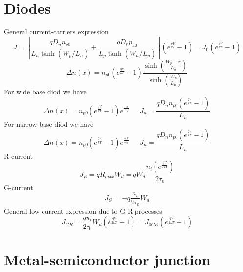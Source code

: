 \section{Diodes}

General current-carriers expression\\
\begin{equation}
J=[\frac{qD_nn_{p0}}{L_n\tanh(W_p/L_n)}+\frac{qD_pp_{n0}}{L_p\tanh(W_n/L_p)}](e^{\frac{qV}{kT}}-1)=J_0(e^{\frac{qV}{kT}}-1)
\end{equation}
\begin{equation}
\Delta n(x)=n_{p0}(e^{\frac{qV}{kT}}-1)\frac{\sinh(\frac{W_p-x}{L_n})}{\sinh(\frac{W_p}{L_n})}
\end{equation}
\vspace{3mm}
For wide base diod we have 
\begin{equation}
\Delta n(x)=n_{p0}(e^{\frac{qV}{kT}}-1)e^{\frac{-x}{L_n}} \ \ \ \ \ \ \ J_n=\frac{qD_nn_{p0}(e^{\frac{qV}{kT}}-1)}{L_n}
\end{equation}
\vspace{3mm}
For narrow base diod we have
\begin{equation}
\Delta n(x)=n_{p0}(e^{\frac{qV}{kT}}-1)e^{\frac{-x}{L_n}} \ \ \ \ \ \ \ J_n=\frac{qD_nn_{p0}(e^{\frac{qV}{kT}}-1)}{L_n}
\end{equation}
\vspace{3mm}
R-current 
\begin{equation}
J_R=qR_{max}W_d=qW_d\frac{n_i(e^{\frac{qV}{2kT}})}{2\tau_0}
\end{equation}
G-current 
\begin{equation}
J_G=-q\frac{n_i}{2\tau_0}W_d
\end{equation}
General low current expression due to G-R processes
\begin{equation}
J_{GR}=\frac{qn_i}{2\tau_0}W_d(e^{\frac{qV}{2kT}}-1)=J_{0GR}(e^{\frac{qV}{2kT}}-1)
\end{equation}

\section{Metal-semiconductor junction}

